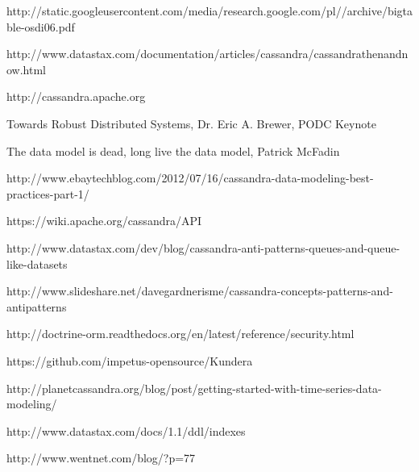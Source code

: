 \begin{thebibliography}{9}

http://static.googleusercontent.com/media/research.google.com/pl//archive/bigtable-osdi06.pdf

http://www.datastax.com/documentation/articles/cassandra/cassandrathenandnow.html

http://cassandra.apache.org

Towards Robust Distributed Systems, Dr. Eric A. Brewer, PODC Keynote

The data model is dead, long live the data model, Patrick McFadin

http://www.ebaytechblog.com/2012/07/16/cassandra-data-modeling-best-practices-part-1/

https://wiki.apache.org/cassandra/API

http://www.datastax.com/dev/blog/cassandra-anti-patterns-queues-and-queue-like-datasets

http://www.slideshare.net/davegardnerisme/cassandra-concepts-patterns-and-antipatterns

http://doctrine-orm.readthedocs.org/en/latest/reference/security.html

https://github.com/impetus-opensource/Kundera

http://planetcassandra.org/blog/post/getting-started-with-time-series-data-modeling/

http://www.datastax.com/docs/1.1/ddl/indexes

http://www.wentnet.com/blog/?p=77

\end{thebibliography}